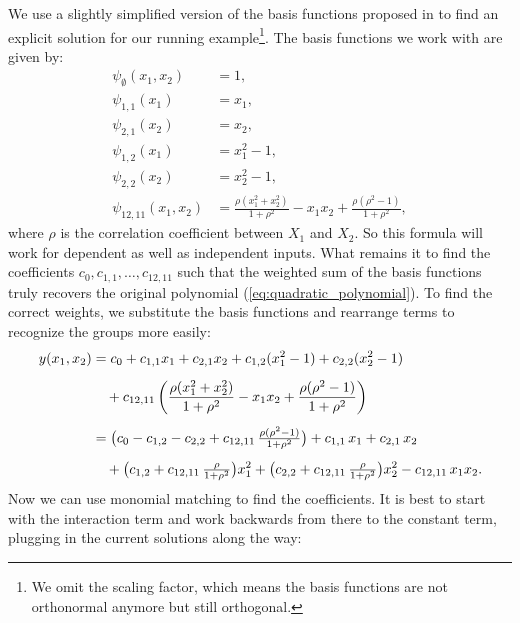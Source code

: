 We use a slightly simplified version of the basis functions proposed in \cite{rahman2014} to find an explicit solution for our running example\footnote{We omit the scaling factor, which means the basis functions are not orthonormal anymore but still orthogonal.}. The basis functions we work with are given by:
\[
\begin{aligned}
\psi_{\emptyset}(x_1,x_2) &= 1, \\[0.5em]
\psi_{1,1}(x_1) &= x_1, \\[0.5em]
\psi_{2,1}(x_2) &= x_2, \\[0.5em]
\psi_{1,2}(x_1) &= x_1^2 - 1, \\[0.5em]
\psi_{2,2}(x_2) &= x_2^2 - 1, \\[0.5em]
\psi_{12,11}(x_1,x_2) &= \frac{\rho (x_1^2 + x_2^2)}{1 + \rho^2} 
                         - x_1 x_2 
                         + \frac{\rho(\rho^2 - 1)}{1 + \rho^2},
\end{aligned}
\]
where $\rho$ is the correlation coefficient between $X_1$ and $X_2$. So this formula will work for dependent as well as independent inputs.
What remains it to find the coefficients $c_0, c_{1,1}, \dots, c_{12, 11}$ such that the weighted sum of the basis functions truly recovers the original polynomial (\autoref{eq:quadratic_polynomial}).
To find the correct weights, we substitute the basis functions and rearrange terms to recognize the groups more easily:
\begin{align*}
y(x_1,x_2) &= c_0 + c_{1,1} x_1 + c_{2,1} x_2 
+ c_{1,2}(x_1^2 - 1) + c_{2,2}(x_2^2 - 1) \notag \\[0.5em]
&\quad + c_{12, 11}\left( \frac{\rho(x_1^2 + x_2^2)}{1 + \rho^2} 
- x_1 x_2 
+ \frac{\rho(\rho^2 - 1)}{1 + \rho^2} \right) \\[0.5em]
&= 
\big( c_0 - c_{1,2} - c_{2,2} + c_{12, 11}\,\tfrac{\rho(\rho^2 - 1)}{1+\rho^2} \big)
+ c_{1,1}\,x_1 
+ c_{2,1}\,x_2 \notag \\[0.5em]
&\quad + \big( c_{1,2} + c_{12, 11}\,\tfrac{\rho}{1+\rho^2} \big) x_1^2
+ \big( c_{2,2} + c_{12, 11}\,\tfrac{\rho}{1+\rho^2} \big) x_2^2
- c_{12, 11}\, x_1 x_2.
\end{align*}
Now we can use monomial matching to find the coefficients. It is best to start with the interaction term and work backwards from there to the constant term, plugging in the current solutions along the way:
